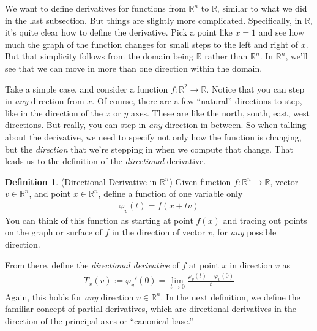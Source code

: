 \documentclass[12pt]{article}
\numberwithin{equation}{section} %
\theoremstyle{plain}
\theoremstyle{definition}
\newtheorem{defn}[thm]{Definition}
\theoremstyle{remark}
\newcommand{\R}{\mathbb{R}}
\newcommand{\Rn}{\mathbb{R}^n}
\begin{document}
We want to define derivatives for functions from $\Rn$ to $\R$, similar
to what we did in the last subsection. But things are slightly more
complicated.  Specifically, in $\R$, it's quite clear how to define the
derivative. Pick a point like $x=1$ and see how much the graph of the
function changes for small steps to the left and right of $x$. But that
simplicity follows from the domain being $\R$ rather than $\Rn$. In
$\Rn$, we'll see that we can move in more than one direction within the
domain.

Take a simple case, and consider a function $f:\R^2\rightarrow \R$.
Notice that you can step in \emph{any} direction from $x$. Of course,
there are a few ``natural'' directions to step, like in the direction of
the $x$ or $y$ axes. These are like the north, south, east, west
directions. But really, you can step in \emph{any} direction in between.
So when talking about the derivative, we need to specify not only how
the function is changing, but the \emph{direction} that we're stepping
in when we compute that change. That leads us to the definition of the
\emph{directional} derivative.
\begin{figure}[htpb!]
\centering
{}
\end{figure}

\begin{defn}{(Directional Derivative in $\Rn$)}
Given function $f:\Rn\rightarrow\R$, vector $v\in\Rn$, and point $x\in
\Rn$, define a function of one variable only
\begin{align*}
  \varphi_v(t) = f(x+tv)
\end{align*}
You can think of this function as starting at point $f(x)$ and tracing
out points on the graph or surface of $f$ in the direction of vector
$v$, for \emph{any} possible direction.

From there, define the \emph{directional derivative} of $f$ at point $x$
in direction $v$ as
\begin{align*}
  T_x(v) := \varphi_v'(0)
  = \lim_{t\rightarrow 0} \frac{\varphi_v(t)-\varphi_v(0)}{t}
\end{align*}
Again, this holds for \emph{any} direction $v\in\Rn$. In the next
definition, we define the familiar concept of partial derivatives, which
are directional derivatives in the direction of the principal axes or
``canonical base.''
\end{defn}
\end{document}
